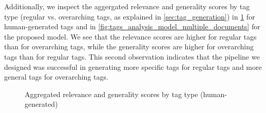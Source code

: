 Additionally, we inspect the aggergated relevance and generality scores by tag type (regular vs. overarching tags, as explained in \cref{sec:tag_generation}) in \cref{fig:tags_analysis_human_multiple_documents} for human-generated tags and in \cref{fig:tags_analysis_model_multiple_documents} for the proposed model. We see that the relevance scores are higher for regular tags than for overarching tags, while the generality scores are higher for overarching tags than for regular tags. This second observation indicates that the pipeline we designed was successful in generating more specific tags for regular tags and more general tags for overarching tags.

\begin{figure}[h]
    \centering
    \hfill
    \caption{Aggregated relevance and generality scores by tag type (human-generated)}
    \label{fig:tags_analysis_human_multiple_documents}
\end{figure}

